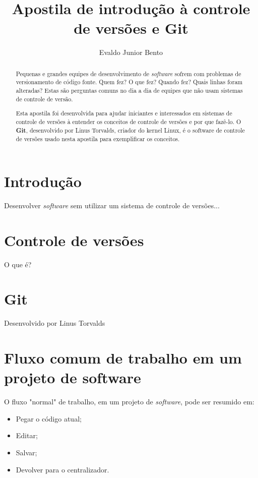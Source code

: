\documentclass[12pt,a4paper]{report}
\begin{document}
\title{Apostila de introdução à controle de versões e Git}
\author{Evaldo Junior Bento}

\maketitle

\begin{abstract}
Pequenas e grandes equipes de desenvolvimento de \textit{software} sofrem
com problemas de versionamento de código fonte. Quem fez? O que fez? Quando
fez? Quais linhas foram alteradas? Estas são perguntas comuns no dia a dia de
equipes que não usam sistemas de controle de versão.

Esta apostila foi desenvolvida para ajudar iniciantes e interessados em
sistemas de controle de versões à entender os conceitos de controle de versões
e por que fazê-lo. O \textbf{Git}, desenvolvido por Linus Torvalds, criador do
kernel Linux, é o software de controle de versões usado nesta apostila para
exemplificar os conceitos.
\end{abstract}

\tableofcontents

\section{Introdução}
Desenvolver \textit{software} sem utilizar um sistema de controle de versões...

\section{Controle de versões}
O que é?

\section{Git}
Desenvolvido por Linus Torvalds

\section{Fluxo comum de trabalho em um projeto de software}
    O fluxo "normal" de trabalho, em um projeto de \textit{software}, pode ser
    resumido em:
    \begin{itemize}
        \item Pegar o código atual;
        \item Editar;
        \item Salvar;
        \item Devolver para o centralizador.
    \end{itemize}
\end{document}
